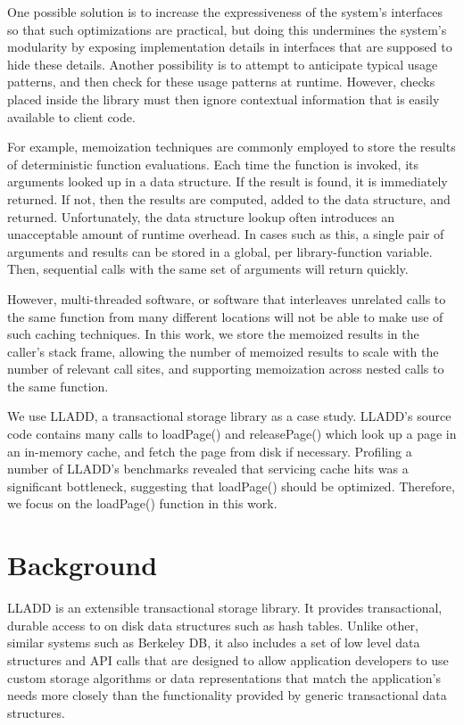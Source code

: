 \documentclass[10pt,letterpaper,twocolumn,english]{article}
\newcommand{\yad}{LLADD\xspace}
\newcommand{\pin}{loadPage()\xspace}
\newcommand{\unpin}{releasePage()\xspace}
\begin{document}
One possible solution is to increase the expressiveness of the system's
interfaces so that such optimizations are practical, but doing this
undermines the system's modularity by exposing implementation details
in interfaces that are supposed to hide these details.  Another
possibility is to attempt to anticipate typical usage patterns, and
then check for these usage patterns at runtime.  However, checks
placed inside the library must then ignore contextual information that
is easily available to client code.

For example, memoization techniques are commonly employed to store the
results of deterministic function evaluations.  Each time the function
is invoked, its arguments looked up in a data structure.  If the
result is found, it is immediately returned.  If not, then the results
are computed, added to the data structure, and returned.
Unfortunately, the data structure lookup often introduces an
unacceptable amount of runtime overhead.  In cases such as this, a
single pair of arguments and results can be stored in a global, per
library-function variable.  Then, sequential calls with the same set
of arguments will return quickly.  

However, multi-threaded software, or software that interleaves
unrelated calls to the same function from many different locations
will not be able to make use of such caching techniques.  In this
work, we store the memoized results in the caller's stack frame,
allowing the number of memoized results to scale with the number of
relevant call sites, and supporting memoization across nested calls to
the same function.

We use \yad, a transactional storage library as a case study.  \yad's
source code contains many calls to \pin and \unpin which look up a
page in an in-memory cache, and fetch the page from disk if necessary.
Profiling a number of \yad's benchmarks revealed that servicing cache
hits was a significant bottleneck, suggesting that \pin should be
optimized.  Therefore, we focus on the \pin function in this work.

\section{Background}
\label {prior}


\yad is an extensible transactional storage library.  It provides
transactional, durable access to on disk data structures such as hash
tables.  Unlike other, similar systems such as Berkeley DB, it also
includes a set of low level data structures and API calls that are
designed to allow application developers to use custom storage
algorithms or data representations that match the application's needs
more closely than the functionality provided by generic transactional
data structures.  
\end{document}
